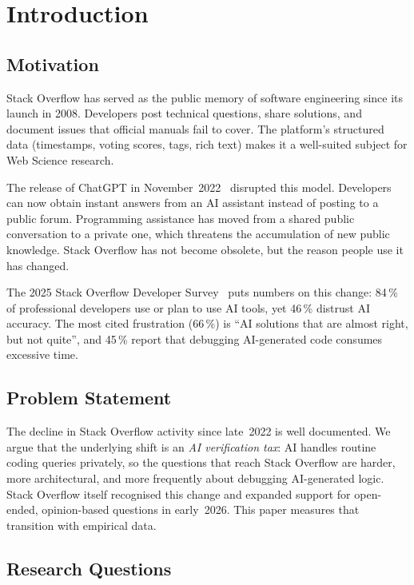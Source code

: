 \documentclass[sigconf]{acmart}
\begin{document}
\section{Introduction}
\label{sec:intro}

\subsection{Motivation}

Stack Overflow has served as the public memory
of software engineering since its launch in 2008.
Developers post technical questions,
share solutions,
and document issues that official manuals
fail to cover.
The platform's structured data
(timestamps, voting scores, tags, rich text)
makes it a well-suited subject
for Web Science research.

The release of ChatGPT in
November~2022~\cite{openai2022chatgpt}
disrupted this model.
Developers can now obtain instant answers
from an AI assistant
instead of posting to a public forum.
Programming assistance has moved
from a shared public conversation
to a private one,
which threatens the accumulation
of new public knowledge.
Stack Overflow has not become obsolete,
but the reason people use it has changed.

The 2025 Stack Overflow Developer Survey~\cite{stackoverflow2025survey}
puts numbers on this change:
84\,\% of professional developers
use or plan to use AI tools,
yet 46\,\% distrust AI accuracy.
The most cited frustration (66\,\%)
is \enquote{AI solutions that are almost right,
but not quite},
and 45\,\% report that debugging AI-generated code
consumes excessive time.

\subsection{Problem Statement}

The decline in Stack Overflow activity since late~2022
is well documented.
We argue that the underlying shift is
an \emph{AI verification tax}:
AI handles routine coding queries privately,
so the questions that reach Stack Overflow
are harder, more architectural,
and more frequently about debugging
AI-generated logic.
Stack Overflow itself recognised this change
and expanded support for open-ended,
opinion-based questions in early~2026.
This paper measures that transition
with empirical data.

\subsection{Research Questions}
\end{document}
